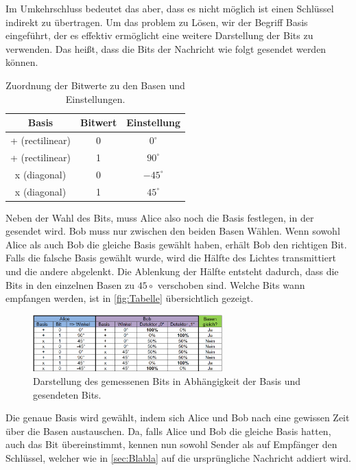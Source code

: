 Im Umkehrschluss bedeutet das aber, dass es nicht möglich ist einen Schlüssel indirekt zu übertragen.
Um das problem zu Lösen, wir der Begriff Basis eingeführt, der es effektiv ermöglicht eine weitere Darstellung der Bits zu verwenden. 
Das heißt, dass die Bits der Nachricht wie folgt gesendet werden können.
\begin{table}[H]
    \centering
    \caption{Zuordnung der Bitwerte zu den Basen und Einstellungen.}
    \begin{tabular}{ccc}
    \toprule
    \textbf{Basis} & \textbf{Bitwert} & \textbf{Einstellung} \\
    \midrule
    + (rectilinear) & 0 & \(0^\circ\) \\
    + (rectilinear) & 1 & \(90^\circ\) \\
    x (diagonal)    & 0 & \(-45^\circ\) \\
    x (diagonal)    & 1 & \(45^\circ\) \\
    \bottomrule
\end{tabular}
\end{table}

Neben der Wahl des Bits, muss Alice also noch die Basis festlegen, in der gesendet wird.
Bob muss nur zwischen den beiden Basen Wählen.
Wenn sowohl Alice als auch Bob die gleiche Basis gewählt haben, erhält Bob den richtigen Bit. Falls die falsche Basis gewählt wurde, wird die Hälfte des Lichtes transmittiert und die andere abgelenkt. Die Ablenkung der Hälfte entsteht dadurch, dass die Bits in den einzelnen Basen zu $45\circ$ verschoben sind.
Welche Bits wann empfangen werden, ist in \autoref{fig:Tabelle} übersichtlich gezeigt.

\begin{figure}[H]
	\centering
	\includegraphics[width=0.65\textwidth]{content/grafik/Tabelle.png}
	\caption{Darstellung des gemessenen Bits in Abhängigkeit der Basis und gesendeten Bits. \cite{krypt}}
	\label{fig:Tabelle}
\end{figure}
Die genaue Basis wird gewählt, indem sich Alice und Bob nach eine gewissen Zeit über die Basen austauschen. Da, falls Alice und Bob die gleiche Basis hatten, auch das Bit übereinstimmt, kennen nun sowohl Sender als auf Empfänger den Schlüssel, welcher wie in \autoref{sec:Blabla} auf die ursprüngliche Nachricht addiert wird.
      
